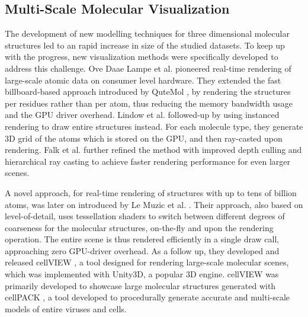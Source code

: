 \documentclass[review,journal]{vgtc}         %
\begin{document}
\subsection{Multi-Scale Molecular Visualization}

The development of new modelling techniques for three dimensional molecular structures led to an rapid increase in size of the studied datasets.
To keep up with the progress, new visualization methods were specifically developed to address this challenge.
Ove Daae Lampe et al.\cite{lampe2007two} pioneered real-time rendering of large-scale atomic data on consumer level hardware. 
They extended the fast billboard-based approach introduced by QuteMol \cite{tarini2006ambient}, by rendering the structures per residues rather than per atom, thus reducing the memory bandwidth usage and the GPU driver overhead. 
Lindow et al. \cite{lindow2012interactive} followed-up by using instanced rendering to draw entire structures instead.
For each molecule type, they generate 3D grid of the atoms which is stored on the GPU, and then ray-casted upon rendering.
Falk et al. \cite{falk2013atomistic} further refined the method with improved depth culling and hierarchical ray casting to achieve faster rendering performance for even larger scenes. 


A novel approach, for real-time rendering of structures with up to tens of billion atoms, was later on introduced by Le Muzic et al. \cite{le2014illustrative}. 
Their approach, also based on level-of-detail, uses tessellation shaders to switch between different degrees of coarseness for the molecular structures, on-the-fly and upon the rendering operation.
The entire scene is thus rendered efficiently in a single draw call, approaching zero GPU-driver overhead. 
As a follow up, they developed and released cellVIEW \cite{muzic2015cellview}, a tool designed for rendering large-scale molecular scenes, which was implemented with Unity3D, a popular 3D engine.
cellVIEW was primarily developed to showcase large molecular structures generated with cellPACK \cite{johnson2015cellpack}, a tool developed to procedurally generate accurate and multi-scale models of entire viruses and cells.
\end{document}
